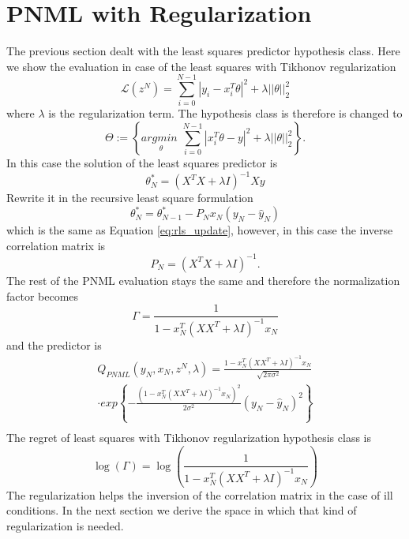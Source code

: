 \documentclass[conference,letterpaper]{IEEEtran}
\begin{document}
\section{PNML with Regularization} \label{sec:PNMLwithReg}
The previous section dealt with the least squares predictor hypothesis class. Here we show the evaluation in case of the least squares with Tikhonov regularization 
\begin{equation}
\mathcal{L}(z^N)= \sum_{i=0}^{N-1}|y_i-x_i^T \theta|^2 + \lambda ||\theta||_2^2
\end{equation}
where $\lambda$ is the regularization term.
The hypothesis class is therefore is changed to
\begin{equation} \label{eq:ls_reg_hypotheses_class}
\Theta := \left\{ \underset{\theta}{\textit{argmin }} \sum_{i=0}^{N-1} | x^T_i \theta - y |^2 + \lambda ||\theta||_2^2 \right\}.
\end{equation}
In this case the solution of the least squares predictor is
\begin{equation}
\theta ^*_N = (X^T X+ \lambda I)^{-1} X y
\end{equation}
Rewrite it in the recursive least square formulation 
\begin{equation}
\theta ^*_N=\theta^*_{N-1} - P_N x_N (y_N - \hat{y}_N)
\end{equation}
which is the same as Equation \ref{eq:rls_update}, however, in this case the inverse correlation matrix is 
\begin{equation}
P_N= (X^T X+ \lambda I)^{-1}.    
\end{equation}
The rest of the PNML evaluation stays the same and therefore the normalization factor becomes
\begin{equation}
\Gamma =\frac{1}{1 - x_N^T (XX^T+ \lambda I)^{-1} x_N } 
\end{equation}
and the predictor is 
\begin{multline} \label{eq:pnml_least_sqaures}
Q_{PNML}(y_N,x_N, z^N, \lambda)
=\frac{1 - x_N^T (XX^T + \lambda I)^{-1} x_N }{\sqrt[]{2\pi\sigma^2}} \\
\cdot exp\left\{-\frac{(1 - x_N^T (XX^T + \lambda I)^{-1} x_N )^2 }{2\sigma^2}\left(y_N- \hat{y}_N \right)^2\right\} \\
\end{multline}
The regret of least squares with Tikhonov regularization hypothesis class is
\begin{equation}
\log (\Gamma) = \log \left( \frac{1}{1 - x_N^T (XX^T + \lambda I)^{-1} x_N } \right)
\end{equation}
The regularization helps the inversion of the correlation matrix in the case of ill conditions. In the next section we derive the space in which that kind of regularization is needed.
\end{document}
